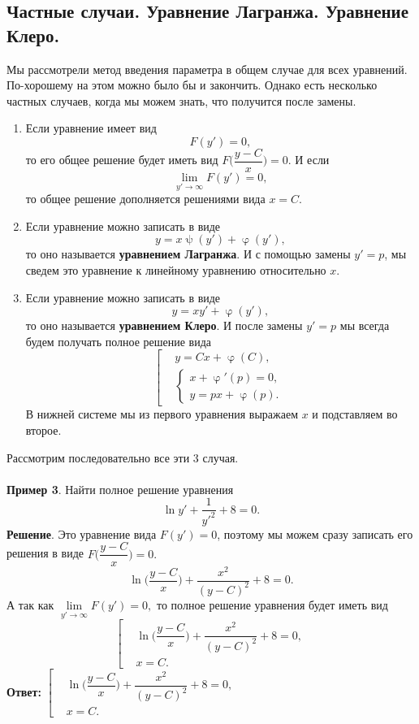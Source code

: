 \documentclass[a4paper, 12pt]{article}
\renewcommand{\varphi}{\upvarphi}
\renewcommand{\psi}{\uppsi}
\renewcommand{\varphi}{\upvarphi}
\renewcommand{\psi}{\uppsi}
\begin{document}
\subsection*{Частные случаи. Уравнение Лагранжа. Уравнение Клеро.}
Мы рассмотрели метод введения параметра в общем случае для всех уравнений. По-хорошему на этом можно было бы и закончить. Однако есть несколько частных случаев, когда мы можем знать, что получится после замены.\begin{enumerate}
	\item Если уравнение имеет вид $$F(y') = 0,$$ то его общее решение будет иметь вид $F\Big(\dfrac{y - C}{x}\Big) = 0.$ И если $$\lim\limits_{y' \to \infty} F(y') = 0,$$ то общее решение дополняется решениями вида $x = C$.
	\item Если уравнение можно записать в виде $$y = x\psi(y') + \varphi(y'),$$ то оно называется \textbf{уравнением Лагранжа}. И с помощью замены $y' = p$, мы сведем это уравнение к линейному уравнению относительно $x$.
	\item Если уравнение можно записать в виде $$y = xy' + \varphi(y'),$$ то оно называется \textbf{уравнением Клеро}. И после замены $y' = p$ мы всегда будем получать полное решение вида $$\left[\begin{aligned}
		&y = Cx + \varphi(C),\\
		&\begin{cases}
			x + \varphi'(p) = 0,\\
			y = px + \varphi(p).
		\end{cases}
	\end{aligned}\right.$$ В нижней системе мы из первого уравнения выражаем $x$ и подставляем во второе.
\end{enumerate}
Рассмотрим последовательно все эти 3 случая.\\\\
\textbf{Пример 3}. Найти полное решение уравнения $$\ln y' + \dfrac{1}{y'^2} + 8 = 0.$$
\textbf{Решение}. Это уравнение вида $F(y') = 0$, поэтому мы можем сразу записать его решения в виде $F\Big(\dfrac{y - C}{x}\Big) = 0.$ $$\ln\Big(\dfrac{y-C}{x}\Big) + \dfrac{x^2}{(y-C)^2} + 8 = 0.$$
А так как $\lim\limits_{y' \to \infty} F(y') = 0,$ то полное решение уравнения будет иметь вид $$\left[\begin{aligned}
	&\ln\Big(\dfrac{y-C}{x}\Big) + \dfrac{x^2}{(y-C)^2} + 8 = 0,\\
	&x = C.
\end{aligned}\right.$$
\textbf{Ответ:} $\left[\begin{aligned}
	&\ln\Big(\dfrac{y-C}{x}\Big) + \dfrac{x^2}{(y-C)^2} + 8 = 0,\\
	&x = C.
\end{aligned}\right.$\\\\
\end{document}
